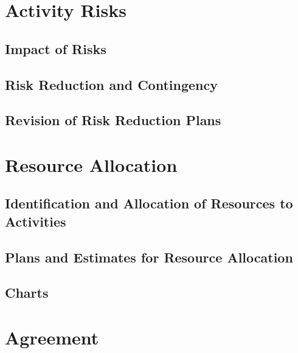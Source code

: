 \documentclass{article}
\begin{document}
	\section{Activity Risks}
		\subsection{Impact of Risks}
		\subsection{Risk Reduction and Contingency}
		\subsection{Revision of Risk Reduction Plans}
	
	\section{Resource Allocation}
		\subsection{Identification and Allocation of Resources to Activities}
		\subsection{Plans and Estimates for Resource Allocation}
		\subsection[Gantt Charts]{Charts}
		
	\section{Agreement}
		
	\newpage
	
	
	
	
	
\end{document}
